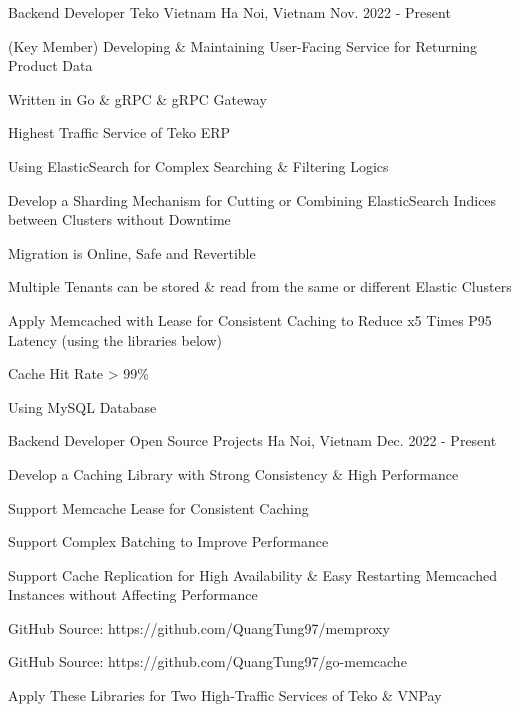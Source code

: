 


\begin{cventries}


\cventry
{Backend Developer} %
{Teko Vietnam} %
{Ha Noi, Vietnam} %
{Nov. 2022 - Present} %
{ %
\begin{cvitems}
\item{(Key Member) Developing \& Maintaining User-Facing Service for Returning Product Data}
\item{Written in Go \& gRPC \& gRPC Gateway}
\item{Highest Traffic Service of Teko ERP}
\item{Using ElasticSearch for Complex Searching \& Filtering Logics}
\item{Develop a Sharding Mechanism for Cutting or Combining ElasticSearch Indices between Clusters without Downtime} 
\item{Migration is Online, Safe and Revertible}
\item{Multiple Tenants can be stored \& read from the same or different Elastic Clusters} 
\item{Apply Memcached with Lease for Consistent Caching to Reduce x5 Times P95 Latency (using the libraries below)}
\item{Cache Hit Rate > 99\%}
\item{Using MySQL Database}
\end{cvitems}
}


\cventry
{Backend Developer} %
{Open Source Projects} %
{Ha Noi, Vietnam} %
{Dec. 2022 - Present} %
{ %
\begin{cvitems}
\item{Develop a Caching Library with Strong Consistency \& High Performance}
\item{Support Memcache Lease for Consistent Caching}
\item{Support Complex Batching to Improve Performance}
\item{Support Cache Replication for High Availability \& Easy Restarting Memcached Instances without Affecting Performance}
\item{GitHub Source: https://github.com/QuangTung97/memproxy}
\item{GitHub Source: https://github.com/QuangTung97/go-memcache}
\item{Apply These Libraries for Two High-Traffic Services of Teko \& VNPay}
\end{cvitems}
}


\end{cventries}
